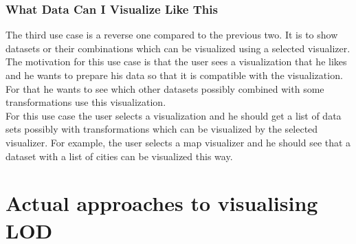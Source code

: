 \documentclass[a4paper,12pt,oneside]{report}
\begin{document}
{{{{\subsubsection{What Data Can I Visualize Like This}
{The third use case is a reverse one compared to the previous two. It is to show datasets or their combinations which can be visualized using a selected visualizer.\\ The motivation for this use case is that the user sees a visualization that he
likes and he wants to prepare his data so that it is compatible with the visualization. For that he wants to see which other datasets possibly combined with some transformations use this visualization. \\ For this use case the user selects a visualization and he should get a list of data sets possibly with transformations which can be visualized by the selected visualizer. For example, the user selects a map visualizer and he should see that a dataset with a list of cities can be visualized this way.}
\section{ Actual approaches to visualising LOD}
}}}}
\end{document}
